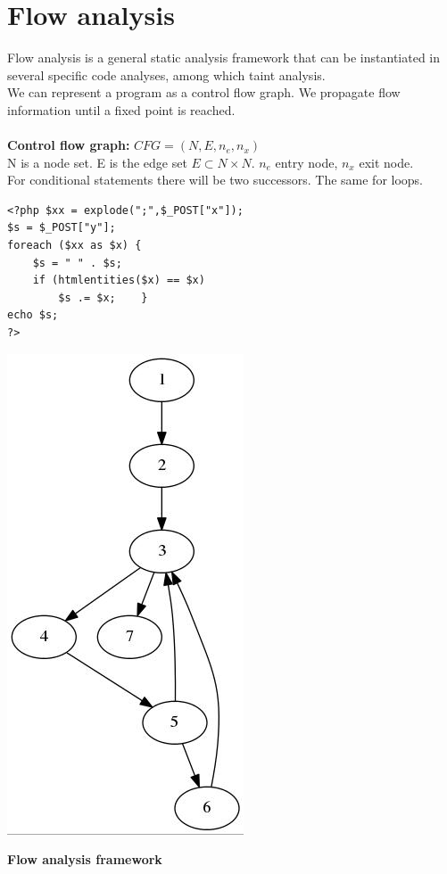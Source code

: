 \documentclass[10pt,a4paper]{article}
\begin{document}
\section{Flow analysis}
Flow analysis is a general static analysis framework that can be instantiated in several specific code analyses, among which taint analysis.\\
We can represent a program as a control flow graph. We propagate flow information until a fixed point is reached.\\\\
\textbf{Control flow graph:} $CFG = (N,E,n_e,n_x)$\\
N is a node set. E is the edge set $E \subset N \times N$. $n_e$ entry node, $n_x$ exit node.\\
For conditional statements there will be two successors. The same for loops.
\begin{verbatim}
<?php $xx = explode(";",$_POST["x"]);
$s = $_POST["y"];
foreach ($xx as $x) {
	$s = " " . $s;
	if (htmlentities($x) == $x)
		$s .= $x;	 }
echo $s;
?>
\end{verbatim}
\begin{center}
\includegraphics[scale=0.5]{img/g1.jpg}
\end{center}
\textbf{Flow analysis framework}
\end{document}

